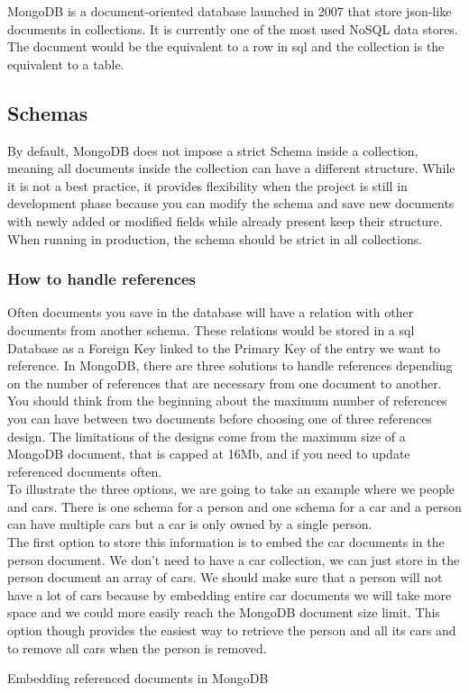 \documentclass[twoside, openright,11pt,a4paper]{book}
\newenvironment{code}{\captionsetup{type=listing}}{}
\begin{document}
MongoDB\cite{wiki:mongo} is a document-oriented database\cite{wiki:document_oriented_db} launched in 2007 that store \gls{json}-like documents in collections. It is currently one of the most used NoSQL data stores. The document would be the equivalent to a row in \gls{sql} and the collection is the equivalent to a table.

\subsection{Schemas}
By default, MongoDB does not impose a strict Schema inside a collection, meaning all documents inside the collection can have a different structure. While it is not a best practice, it provides flexibility when the project is still in development phase because you can modify the schema and save new documents with newly added or modified fields while already present keep their structure. When running in production, the schema should be strict in all collections. \\
\subsubsection{How to handle references}
\label{mongo_references}
Often documents you save in the database will have a relation with other documents from another schema. These relations would be stored in a \gls{sql} Database as a Foreign Key linked to the Primary Key of the entry we want to reference. In MongoDB, there are three solutions to handle references depending on the number of references that are necessary from one document to another. You should think from the beginning about the maximum number of references you can have between two documents before choosing one of three references design. The limitations of the designs come from the maximum size of a MongoDB document, that is capped at 16Mb, and if you need to update referenced documents often. \\

To illustrate the three options, we are going to take an example where we people and cars. There is one schema for a person and one schema for a car and a person can have multiple cars but a car is only owned by a single person. \\

The first option to store this information is to embed the car documents in the person document\cite{mongo:doc:refs:embeddingRefs}. We don't need to have a car collection, we can just store in the person document an array of cars. We should make sure that a person will not have a lot of cars because by embedding entire car documents we will take more space and we could more easily reach the MongoDB document size limit. This option though provides the easiest way to retrieve the person and all its cars and to remove all cars when the person is removed. \\
\begin{code}
	\caption{Embedding referenced documents in MongoDB}
\end{code}
\end{document}
